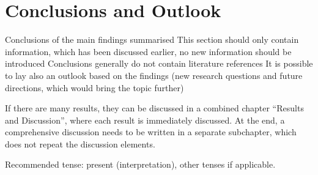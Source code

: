 \chapter{Conclusions and Outlook} \label{conclusion_outlook}

    Conclusions of the main findings summarised
    This section should only contain information, which has been discussed earlier, no new information should be introduced
    Conclusions generally do not contain literature references
    It is possible to lay also an outlook based on the findings (new research questions and future directions, which would bring the topic further)

If there are many results, they can be discussed in a combined chapter “Results and Discussion”, where each result is immediately discussed. At the end, a comprehensive discussion needs to be written in a separate subchapter, which does not repeat the discussion elements.

Recommended tense: present (interpretation), other tenses if applicable.